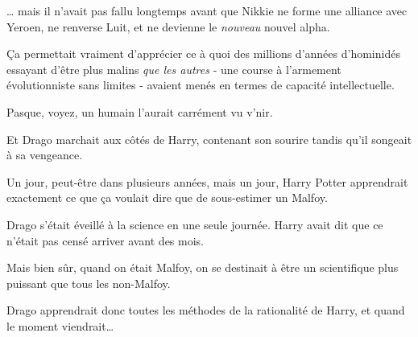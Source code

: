 … mais il n'avait pas fallu longtemps avant que Nikkie ne forme une alliance avec Yeroen, ne renverse Luit, et ne devienne le \emph{nouveau} nouvel alpha.

Ça permettait vraiment d'apprécier ce à quoi des millions d'années d'hominidés essayant d'être plus malins \emph{que les autres} - une course à l'armement évolutionniste sans limites - avaient menés en termes de capacité intellectuelle.

Pasque, voyez, un humain l'aurait carrément vu v'nir.

\later

Et Drago marchait aux côtés de Harry, contenant son sourire tandis qu'il songeait à sa vengeance.

Un jour, peut-être dans plusieurs années, mais un jour, Harry Potter apprendrait exactement ce que ça voulait dire que de sous-estimer un Malfoy.

Drago s'était éveillé à la science en une seule journée. Harry avait dit que ce n'était pas censé arriver avant des mois.

Mais bien sûr, quand on était Malfoy, on se destinait à être un scientifique plus puissant que tous les non-Malfoy.

Drago apprendrait donc toutes les méthodes de la rationalité de Harry, et quand le moment viendrait… 

